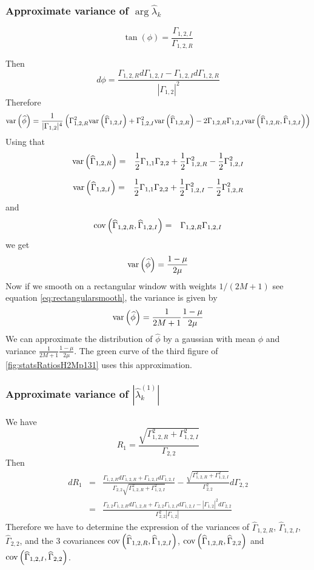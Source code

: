 \subsubsection{Approximate variance of $\arg \hat\lambda_{k}$}%

$$
 \tan(\phi) = \frac{\Gamma_{1,2,I} }{\Gamma_{1,2,R}}
$$


Then
$$
 d\phi =
 \frac{\Gamma_{1,2,R}d\Gamma_{1,2,I}-\Gamma_{1,2,I}d\Gamma_{1,2,R}}
      {|\Gamma_{1,2}|^{2}}
$$
Therefore
$$
 \mathrm{var}\left( \widehat \phi \right)=\frac{1}{|\Gamma_{1,2}|^{4}}
 \left(
 \Gamma_{1,2,R}^{2}\mathrm{var}\left( \widehat \Gamma_{1,2,I} \right)
 +
 \Gamma_{1,2,I}^{2}\mathrm{var}\left( \widehat \Gamma_{1,2,R} \right)
 -
 2\Gamma_{1,2,R}\Gamma_{1,2,I}\mathrm{var}\left( \widehat \Gamma_{1,2,R},\widehat \Gamma_{1,2,I} \right)
 \right)
$$
Using that 
\begin{eqnarray*}
 \mathrm{var}\left( \widehat \Gamma_{1,2,R} \right)
 &=&
 \frac{1}{2}\Gamma_{1,1}\Gamma_{2,2}+\frac{1}{2}\Gamma_{1,2,R}^{2}-\frac{1}{2}\Gamma_{1,2,I}^{2}
\end{eqnarray*}

\begin{eqnarray*}
 \mathrm{var}\left( \widehat \Gamma_{1,2,I} \right)
 &=&
 \frac{1}{2}\Gamma_{1,1}\Gamma_{2,2}+\frac{1}{2}
 \Gamma_{1,2,I}^{2}-\frac{1}{2}\Gamma_{1,2,R}^{2}
\end{eqnarray*}
and
\begin{eqnarray*}
 \mathrm{cov}\left( \widehat \Gamma_{1,2,R},\widehat \Gamma_{1,2,I} \right)
 &=&
\Gamma_{1,2,R}\Gamma_{1,2,I}
\end{eqnarray*}
we get
$$
 \mathrm{var}\left( \widehat \phi \right)=\frac{1-\mu}{2\mu}
$$
Now if we smooth on a rectangular window with weights $1/(2M+1)$ see equation \eqref{eq:rectangularsmooth}, the variance
is given by
$$
 \mathrm{var}\left( \widehat \phi \right)=\frac{1}{2M+1}\frac{1-\mu}{2\mu}
$$
We can approximate the distribution of $\hat \phi$ by a gaussian with mean $\phi$ and variance 
$\frac{1}{2M+1}\frac{1-\mu}{2\mu}$. The green curve of the third figure of \ref{fig:statsRatiosH2Mp131} uses this approximation.
\subsubsection{Approximate variance of $|\hat\lambda_{k}^{(1)}|$}%
We have
$$
 R_{1}=\frac{\sqrt{\Gamma_{1,2,R}^{2}+\Gamma_{1,2,I}^{2}}}{\Gamma_{2,2}}
$$
Then
\begin{eqnarray*}
  dR_{1} &=&
 \frac{\Gamma_{1,2,R}d\Gamma_{1,2,R}+\Gamma_{1,2,I}d\Gamma_{1,2,I}}
      {\Gamma_{2,2}\sqrt{\Gamma_{1,2,R}^{2}+\Gamma_{1,2,I}^{2}}}
      -\frac{\sqrt{\Gamma_{1,2,R}^{2}+\Gamma_{1,2,I}^{2}}}{\Gamma_{2,2}^{2}}d\Gamma_{2,2}
 \\
 &=&
  \frac{\Gamma_{2,2}\Gamma_{1,2,R}d\Gamma_{1,2,R}+\Gamma_{2,2}\Gamma_{1,2,I}d\Gamma_{1,2,I}
   -|\Gamma_{1,2}|^{2}d\Gamma_{2,2}}
      {\Gamma_{2,2}^{2}|\Gamma_{1,2}|}
\end{eqnarray*}
Therefore we have to determine the expression of the variances of $\hat\Gamma_{1,2,R}$, $\hat\Gamma_{1,2,I}$, $\hat\Gamma_{2,2}$, and the 3 covariances $\mathrm{cov}\left( \widehat\Gamma_{1,2,R},\widehat\Gamma_{1,2,I} \right)$, $\mathrm{cov}\left( \widehat\Gamma_{1,2,R},\widehat\Gamma_{2,2} \right)$
and
$\mathrm{cov}\left( \widehat\Gamma_{1,2,I},\widehat\Gamma_{2,2} \right)$.

